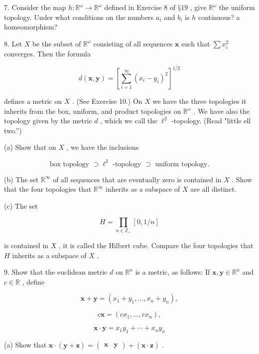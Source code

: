 7. Consider the map \(h : {\mathbb{R}}^{\omega } \rightarrow  {\mathbb{R}}^{\omega }\) defined in Exercise 8 of \(§{19}\) , give \({\mathbb{R}}^{\omega }\) the uniform topology. Under what conditions on the numbers \({a}_{i}\) and \({b}_{i}\) is \(h\) continuous? a homeomorphism?

8. Let \(X\) be the subset of \({\mathbb{R}}^{\omega }\) consisting of all sequences \(\mathbf{x}\) such that \(\sum {x}_{i}^{2}\) converges. Then the formula

\[
d\left( {\mathbf{x},\mathbf{y}}\right)  = {\left\lbrack  \mathop{\sum }\limits_{{i = 1}}^{\infty }{\left( {x}_{i} - {y}_{i}\right) }^{2}\right\rbrack  }^{1/2}
\]

defines a metric on \(X\) . (See Exercise 10.) On \(X\) we have the three topologies it inherits from the box, uniform, and product topologies on \({\mathbb{R}}^{\omega }\) . We have also the topology given by the metric \(d\) , which we call the \({\ell }^{2}\) -topology. (Read "little ell two.”)

(a) Show that on \(X\) , we have the inclusions

\[
\text{ box topology } \supset  {\ell }^{2}\text{ -topology } \supset  \text{ uniform topology. }
\]

(b) The set \({\mathbb{R}}^{\infty }\) of all sequences that are eventually zero is contained in \(X\) . Show that the four topologies that \({\mathbb{R}}^{\infty }\) inherits as a subspace of \(X\) are all distinct.

(c) The set

\[
H = \mathop{\prod }\limits_{{n \in  {\mathbb{Z}}_{ + }}}\left\lbrack  {0,1/n}\right\rbrack
\]

is contained in \(X\) , it is called the Hilbert cube. Compare the four topologies that \(H\) inherits as a subspace of \(X\) .

9. Show that the euclidean metric \(d\) on \({\mathbb{R}}^{n}\) is a metric, as follows: If \(\mathbf{x},\mathbf{y} \in  {\mathbb{R}}^{n}\) and \(c \in  \mathbb{R}\) , define

\[
\mathbf{x} + \mathbf{y} = \left( {{x}_{1} + {y}_{1},\ldots ,{x}_{n} + {y}_{n}}\right) ,
\]

\[
c\mathbf{x} = \left( {c{x}_{1},\ldots ,c{x}_{n}}\right) ,
\]

\[
\mathbf{x} \cdot  \mathbf{y} = {x}_{1}{y}_{1} + \cdots  + {x}_{n}{y}_{n}
\]

(a) Show that \(\mathbf{x} \cdot  \left( {\mathbf{y} + \mathbf{z}}\right)  = \left( \begin{array}{ll} \mathbf{x} & \mathbf{y} \end{array}\right)  + \left( {\mathbf{x} \cdot  \mathbf{z}}\right)\) .

